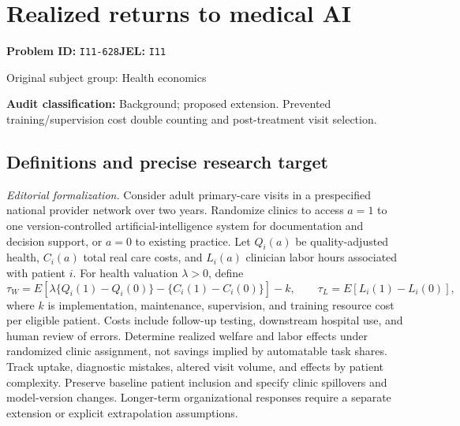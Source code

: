 \documentclass[11pt,a4paper]{article}
\begin{document}
\section*{Realized returns to medical AI}
\textbf{Problem ID:} \texttt{I11-628}\quad \textbf{JEL:} \texttt{I11}\par
\label{problem:OP-0447}
{\sffamily\small\color{muted}Original subject group: Health economics\par}
\label{definitions:problem:30007729}
\textbf{Audit classification:} Background; proposed extension. Prevented training/supervision cost double counting and post-treatment visit selection.
\subsection*{Definitions and precise research target}
\textit{Editorial formalization.} Consider adult primary-care visits in a prespecified national provider network over two years. Randomize clinics to access \(a=1\) to one version-controlled artificial-intelligence system for documentation and decision support, or \(a=0\) to existing practice. Let \(Q_i(a)\) be quality-adjusted health, \(C_i(a)\) total real care costs, and \(L_i(a)\) clinician labor hours associated with patient \(i\). For health valuation \(\lambda>0\), define
\[\tau_W=E[\lambda\{Q_i(1)-Q_i(0)\}-\{C_i(1)-C_i(0)\}]-k,\qquad\tau_L=E[L_i(1)-L_i(0)],\]
where \(k\) is implementation, maintenance, supervision, and training resource cost per eligible patient. Costs include follow-up testing, downstream hospital use, and human review of errors. Determine realized welfare and labor effects under randomized clinic assignment, not savings implied by automatable task shares. Track uptake, diagnostic mistakes, altered visit volume, and effects by patient complexity. Preserve baseline patient inclusion and specify clinic spillovers and model-version changes. Longer-term organizational responses require a separate extension or explicit extrapolation assumptions.
\end{document}
